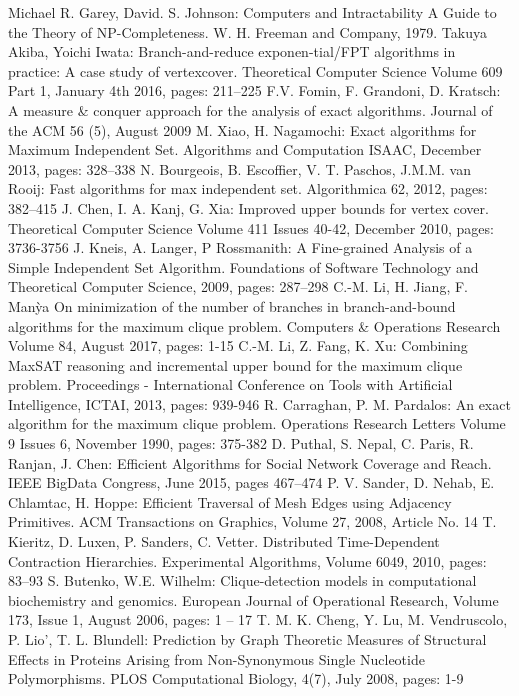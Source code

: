 \documentclass[]{article}
\begin{document}
\begin{thebibliography}{xx}
	 Michael R. Garey, David. S. Johnson: Computers and Intractability A Guide to the Theory of NP-Completeness. W. H. Freeman and Company, 1979.
	 Takuya Akiba, Yoichi Iwata: Branch-and-reduce exponen-tial/FPT algorithms in practice: A case study of vertexcover. Theoretical Computer Science Volume 609 Part 1, January 4th 2016, pages: 211–225
	 F.V. Fomin, F. Grandoni, D. Kratsch: A measure \& conquer approach for the analysis of exact algorithms. Journal of the ACM 56 (5), August 2009
	M. Xiao, H. Nagamochi: Exact algorithms for Maximum Independent Set. Algorithms
	and Computation ISAAC, December 2013, pages: 328–338
	N. Bourgeois, B. Escoffier, V. T. Paschos, J.M.M. van Rooij: Fast algorithms for
	max independent set. Algorithmica 62, 2012, pages: 382–415
	J. Chen, I. A. Kanj, G. Xia: Improved upper bounds for vertex cover. Theoretical Computer Science Volume 411 Issues 40-42, December 2010, pages: 3736-3756
	J. Kneis, A. Langer, P Rossmanith: A Fine-grained Analysis of a Simple Independent Set Algorithm. Foundations of Software Technology and Theoretical Computer Science, 2009, pages: 287–298
	 C.-M. Li, H. Jiang, F. Manỳa On minimization of the number of branches in branch-and-bound algorithms for the maximum clique problem. Computers \& Operations Research Volume 84, August 2017, pages: 1-15
	 C.-M. Li, Z. Fang, K. Xu: Combining MaxSAT reasoning and incremental upper bound for the maximum clique problem. Proceedings - International Conference on Tools with Artificial Intelligence, ICTAI, 2013, pages: 939-946
	 R. Carraghan, P. M. Pardalos: An exact algorithm for the maximum clique problem. Operations Research Letters Volume 9 Issues 6, November 1990, pages: 375-382
	 D. Puthal, S. Nepal, C. Paris, R. Ranjan, J. Chen: Efficient Algorithms for Social Network Coverage and Reach. IEEE BigData Congress, June 2015, pages 467–474
	 P. V. Sander, D. Nehab, E. Chlamtac, H. Hoppe: Efficient Traversal of Mesh Edges using Adjacency Primitives. ACM Transactions on Graphics, Volume 27, 2008, Article No. 14
	T. Kieritz, D. Luxen, P. Sanders, C. Vetter. Distributed Time-Dependent Contraction Hierarchies. Experimental Algorithms, Volume 6049, 2010, pages: 83–93
	 S. Butenko, W.E. Wilhelm: Clique-detection models in computational biochemistry and genomics. European Journal of Operational Research, Volume 173, Issue 1, August 2006, pages: 1 – 17
	 T. M. K. Cheng, Y. Lu, M. Vendruscolo, P. Lio’, T. L. Blundell: Prediction by Graph Theoretic Measures of Structural Effects in Proteins Arising from Non-Synonymous Single Nucleotide Polymorphisms. PLOS Computational Biology, 4(7), July 2008, pages: 1-9
\end{thebibliography}
\end{document}

